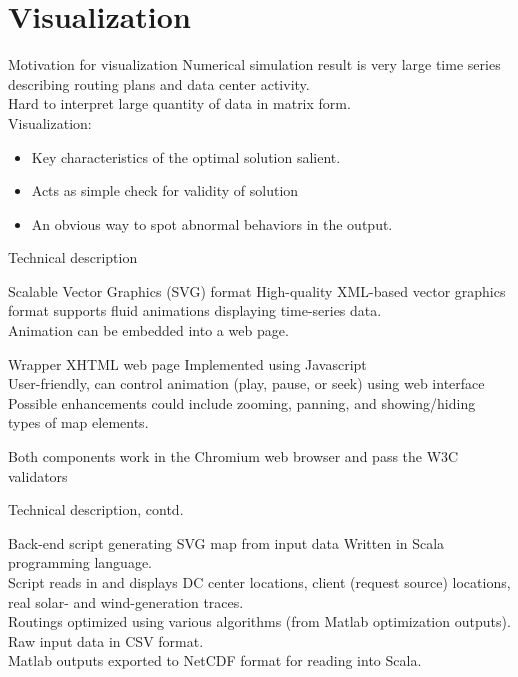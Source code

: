 \documentclass[xcolor=dvipsnames]{beamer}
\begin{document}
\section{Visualization}
\begin{frame}{Motivation for visualization}
Numerical simulation result is very large time series describing routing plans and data center activity. \\
\vspace{2mm}
Hard to interpret large quantity of data in matrix form. \\
\vspace{2mm}
Visualization:  
	\begin{itemize}
	\item Key characteristics of the optimal solution salient.
	\item Acts as simple check for validity of solution
	\item An obvious way to spot abnormal behaviors in the output.
	\end{itemize}
\end{frame}
\begin{frame}{Technical description}
 	\begin{block}{Scalable Vector Graphics (SVG) format}
	High-quality XML-based vector graphics format supports fluid animations displaying time-series data. \\ 
	Animation can be embedded into a web page.
	\begin{block}{Wrapper XHTML web page} 
	Implemented using Javascript \\	
	User-friendly, can control animation (play, pause, or seek) using web interface \\
	Possible enhancements could include zooming, panning, and showing/hiding types of map elements.
	\begin{block}{Both components work in the Chromium web browser and pass the W3C validators}
	\end{block}
	\end{block}
	\end{block}
\end{frame}
\begin{frame}{Technical description, contd.}
	\begin{block}{Back-end script generating SVG map from input data}
	Written in Scala programming language. \\
	Script reads in and displays DC center locations, client (request source) locations, real solar- and wind-generation traces. \\
	Routings optimized using various algorithms (from Matlab optimization outputs). \\
	Raw input data in CSV format.\\
	Matlab outputs exported to NetCDF format for reading into Scala.
	\end{block}

\end{frame}
\end{document}
